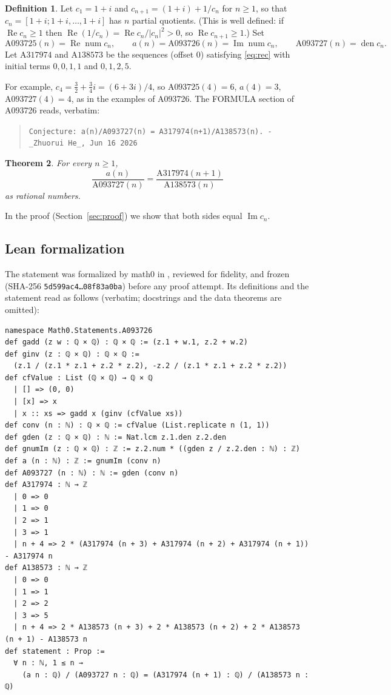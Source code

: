\documentclass[11pt]{amsart}
\theoremstyle{plain}
\newtheorem{theorem}{Theorem}
\theoremstyle{definition}
\newtheorem{definition}[theorem]{Definition}
\newcommand{\seq}[1]{\mathrm{A#1}}
\DeclareMathOperator{\re}{Re}
\DeclareMathOperator{\im}{Im}
\DeclareMathOperator{\den}{den}
\DeclareMathOperator{\num}{num}
\begin{document}
\begin{definition}\label{def:seq}
Let $c_1=1+i$ and $c_{n+1}=(1+i)+1/c_n$ for $n\ge1$, so that $c_n=[1+i;1+i,\dots,1+i]$ has $n$ partial quotients. (This is well defined: if $\re c_n\ge1$ then $\re(1/c_n)=\re c_n/|c_n|^2>0$, so $\re c_{n+1}\ge1$.) Set
\[
\seq{093725}(n)=\re\num c_n,\qquad a(n)=\seq{093726}(n)=\im\num c_n,\qquad \seq{093727}(n)=\den c_n.
\]
Let $\seq{317974}$ and $\seq{138573}$ be the sequences (offset $0$) satisfying \eqref{eq:rec} with initial terms $0,0,1,1$ and $0,1,2,5$.
\end{definition}

For example, $c_4=\frac32+\frac34 i=(6+3i)/4$, so $\seq{093725}(4)=6$, $a(4)=3$, $\seq{093727}(4)=4$, as in the examples of A093726.
The FORMULA section of A093726 reads, verbatim:
\begin{quote}
{\small\raggedright\texttt{Conjecture: a(n)/A093727(n) = A317974(n+1)/A138573(n). - \_Zhuorui He\_, Jun 16 2026}\par}
\end{quote}

\begin{theorem}\label{thm:main}
For every $n\ge1$,
\[
\frac{a(n)}{\seq{093727}(n)}=\frac{\seq{317974}(n+1)}{\seq{138573}(n)}
\]
as rational numbers.
\end{theorem}

In the proof (Section~\ref{sec:proof}) we show that both sides equal $\im c_n$.

\subsection*{Lean formalization}
The statement was formalized by math0 in , reviewed for fidelity, and frozen (SHA-256 \texttt{5d599ac4\ldots 08f83a0ba}) before any proof attempt. Its definitions and the statement read as follows (verbatim; docstrings and the data theorems are omitted):
\begin{lstlisting}
namespace Math0.Statements.A093726
def gadd (z w : ℚ × ℚ) : ℚ × ℚ := (z.1 + w.1, z.2 + w.2)
def ginv (z : ℚ × ℚ) : ℚ × ℚ :=
  (z.1 / (z.1 * z.1 + z.2 * z.2), -z.2 / (z.1 * z.1 + z.2 * z.2))
def cfValue : List (ℚ × ℚ) → ℚ × ℚ
  | [] => (0, 0)
  | [x] => x
  | x :: xs => gadd x (ginv (cfValue xs))
def conv (n : ℕ) : ℚ × ℚ := cfValue (List.replicate n (1, 1))
def gden (z : ℚ × ℚ) : ℕ := Nat.lcm z.1.den z.2.den
def gnumIm (z : ℚ × ℚ) : ℤ := z.2.num * ((gden z / z.2.den : ℕ) : ℤ)
def a (n : ℕ) : ℤ := gnumIm (conv n)
def A093727 (n : ℕ) : ℕ := gden (conv n)
def A317974 : ℕ → ℤ
  | 0 => 0
  | 1 => 0
  | 2 => 1
  | 3 => 1
  | n + 4 => 2 * (A317974 (n + 3) + A317974 (n + 2) + A317974 (n + 1)) - A317974 n
def A138573 : ℕ → ℤ
  | 0 => 0
  | 1 => 1
  | 2 => 2
  | 3 => 5
  | n + 4 => 2 * A138573 (n + 3) + 2 * A138573 (n + 2) + 2 * A138573 (n + 1) - A138573 n
def statement : Prop :=
  ∀ n : ℕ, 1 ≤ n →
    (a n : ℚ) / (A093727 n : ℚ) = (A317974 (n + 1) : ℚ) / (A138573 n : ℚ)
\end{lstlisting}
\end{document}
